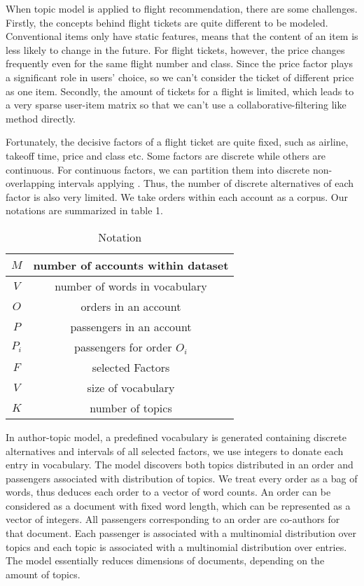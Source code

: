 \documentclass{sig-alternate-05-2015}
\begin{document}
When topic model is applied to flight recommendation, there are some challenges. Firstly, the concepts behind flight tickets are quite different to be modeled. Conventional items only have static features, means that the content of an item is less likely to change in the future. For flight tickets, however, the price changes frequently even for the same flight number and class. Since the price factor plays a significant role in users' choice, so we can't consider the ticket of different price as one item. Secondly, the amount of tickets for a flight is limited, which leads to a very sparse user-item matrix so that we can't use a collaborative-filtering like method directly.\par

Fortunately, the decisive factors of a flight ticket are quite fixed, such as airline, takeoff time, price and class etc. Some factors are discrete while others are continuous. For continuous factors, we can partition them into discrete non-overlapping intervals applying . Thus, the number of discrete alternatives of each factor is also very limited. We take orders within each account as a corpus. Our notations are summarized in table 1.\par
\begin{table}[!htbp]
\centering
\caption{Notation}
\begin{tabular}{|c|c|} \hline
$M$ & number of accounts within dataset\\ \hline
$V$ & number of words in vocabulary\\ \hline
$O$ & orders in an account\\ \hline
$P$ & passengers in an account\\ \hline
$P_i$ & passengers for order $O_i$ \\ \hline
$F$ & selected Factors\\ \hline
$V$ & size of vocabulary\\ \hline
$K$ & number of topics\\ \hline
\end{tabular}
\end{table}

In author-topic model\cite{deiv:corpora}, a predefined vocabulary is generated containing discrete alternatives and intervals of all selected factors, we use integers to donate each entry in vocabulary. The model discovers both topics distributed in an order and passengers associated with distribution of topics. We treat every order as a bag of words, thus deduces each order to a vector of word counts. An order can be considered as a document with fixed word length, which can be represented as a vector of integers. All passengers corresponding to an order are co-authors for that document. Each passenger is associated with a multinomial distribution over topics and each topic is associated with a multinomial distribution over entries. The model essentially reduces dimensions of documents, depending on the amount of topics.\par
\end{document}
